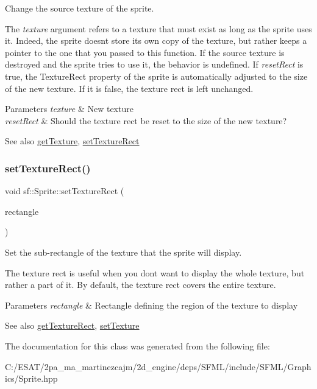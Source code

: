 Change the source texture of the sprite. 

The {\itshape texture} argument refers to a texture that must exist as long as the sprite uses it. Indeed, the sprite doesn\textquotesingle{}t store its own copy of the texture, but rather keeps a pointer to the one that you passed to this function. If the source texture is destroyed and the sprite tries to use it, the behavior is undefined. If {\itshape reset\+Rect} is true, the Texture\+Rect property of the sprite is automatically adjusted to the size of the new texture. If it is false, the texture rect is left unchanged.


\begin{DoxyParams}{Parameters}
{\em texture} & New texture \\
\hline
{\em reset\+Rect} & Should the texture rect be reset to the size of the new texture?\\
\hline
\end{DoxyParams}
\begin{DoxySeeAlso}{See also}
\hyperlink{classsf_1_1_sprite_a1a76155146c8ff37c4eb5a306b4e9ebe}{get\+Texture}, \hyperlink{classsf_1_1_sprite_a3fefec419a4e6a90c0fd54c793d82ec2}{set\+Texture\+Rect} 
\end{DoxySeeAlso}
\mbox{\label{classsf_1_1_sprite_a3fefec419a4e6a90c0fd54c793d82ec2}} 
\subsubsection{\texorpdfstring{set\+Texture\+Rect()}{setTextureRect()}}
{\footnotesize\ttfamily void sf\+::\+Sprite\+::set\+Texture\+Rect (\begin{DoxyParamCaption}\item[{const \hyperlink{classsf_1_1_rect}{Int\+Rect} \&}]{rectangle }\end{DoxyParamCaption})}



Set the sub-\/rectangle of the texture that the sprite will display. 

The texture rect is useful when you don\textquotesingle{}t want to display the whole texture, but rather a part of it. By default, the texture rect covers the entire texture.


\begin{DoxyParams}{Parameters}
{\em rectangle} & Rectangle defining the region of the texture to display\\
\hline
\end{DoxyParams}
\begin{DoxySeeAlso}{See also}
\hyperlink{classsf_1_1_sprite_a3492896fe7b63f58ae022c5b8bec5c98}{get\+Texture\+Rect}, \hyperlink{classsf_1_1_sprite_a3729c88d88ac38c19317c18e87242560}{set\+Texture} 
\end{DoxySeeAlso}


The documentation for this class was generated from the following file\+:\begin{DoxyCompactItemize}
\item 
C\+:/\+E\+S\+A\+T/2pa\+\_\+ma\+\_\+martinezcajm/2d\+\_\+engine/deps/\+S\+F\+M\+L/include/\+S\+F\+M\+L/\+Graphics/Sprite.\+hpp\end{DoxyCompactItemize}
